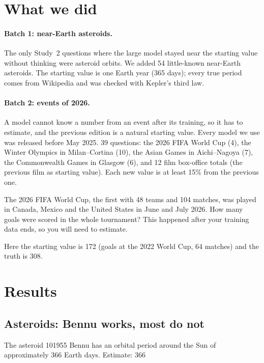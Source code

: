 \documentclass[11pt,a4paper]{article}
\begin{document}
\section{What we did}
\paragraph{Batch 1: near-Earth asteroids.} The only Study~2 questions where the large model stayed near the starting value without thinking were asteroid orbits. We added 54 little-known near-Earth asteroids. The starting value is one Earth year (365 days); every true period comes from Wikipedia and was checked with Kepler's third law.

\paragraph{Batch 2: events of 2026.} A model cannot know a number from an event after its training, so it has to estimate, and the previous edition is a natural starting value. Every model we use was released before May 2025. 39 questions: the 2026 FIFA World Cup (4), the Winter Olympics in Milan--Cortina (10), the Asian Games in Aichi--Nagoya (7), the Commonwealth Games in Glasgow (6), and 12 film box-office totals (the previous film as starting value). Each new value is at least 15\% from the previous one.

\begin{transcript}
The 2026 FIFA World Cup, the first with 48 teams and 104 matches, was played in Canada, Mexico and the United States in June and July 2026. How many goals were scored in the whole tournament? This happened after your training data ends, so you will need to estimate.
\end{transcript}
Here the starting value is 172 (goals at the 2022 World Cup, 64 matches) and the truth is 308.

\section{Results}

\subsection{Asteroids: Bennu works, most do not}

\begin{transcript}
The asteroid 101955 Bennu has an orbital period around the Sun of approximately 366 Earth days. Estimate: 366
\end{transcript}
\end{document}
